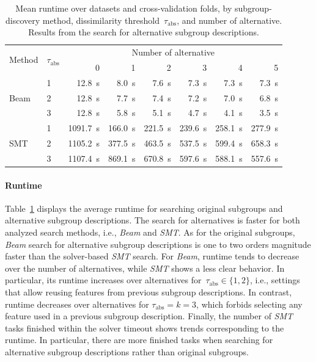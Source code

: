 \documentclass{article}
\theoremstyle{definition}
\begin{document}
\begin{table}[t]
	\centering
	\begin{tabular}{llrrrrrr}
		\toprule
		\multirow{2}{*}{Method} & \multirow{2}{*}{$\tau_{\text{abs}}$} & \multicolumn{6}{c}{Number of alternative} \\
		\cmidrule(lr){3-8}
		& &  0 & 1 & 2 & 3 & 4 & 5 \\
		\midrule
		\multirow[t]{3}{*}{Beam} & 1 & 12.8~s & 8.0~s & 7.6~s & 7.3~s & 7.3~s & 7.3~s \\
		& 2 & 12.8~s & 7.7~s & 7.4~s & 7.2~s & 7.0~s & 6.8~s \\
		& 3 & 12.8~s & 5.8~s & 5.1~s & 4.7~s & 4.1~s & 3.5~s \\
		\multirow[t]{3}{*}{SMT} & 1 & 1091.7~s & 166.0~s & 221.5~s & 239.6~s & 258.1~s & 277.9~s \\
		& 2 & 1105.2~s & 377.5~s & 463.5~s & 537.5~s & 599.4~s & 658.3~s \\
		& 3 & 1107.4~s & 869.1~s & 670.8~s & 597.6~s & 588.1~s & 557.6~s \\
		\bottomrule
	\end{tabular}
	\caption{
		Mean runtime over datasets and cross-validation folds, by subgroup-discovery method, dissimilarity threshold~$\tau_{\text{abs}}$, and number of alternative.
		Results from the search for alternative subgroup descriptions.
	}
	\label{tab:csd:alteratives-runtime}
\end{table}

\paragraph{Runtime}

Table~\ref{tab:csd:alteratives-runtime} displays the average runtime for searching original subgroups and alternative subgroup descriptions.
The search for alternatives is faster for both analyzed search methods, i.e., \emph{Beam} and \emph{SMT}.
As for the original subgroups, \emph{Beam} search for alternative subgroup descriptions is one to two orders magnitude faster than the solver-based \emph{SMT} search.
For \emph{Beam}, runtime tends to decrease over the number of alternatives, while \emph{SMT} shows a less clear behavior.
In particular, its runtime increases over alternatives for~$\tau_{\text{abs}} \in \{1, 2\}$, i.e., settings that allow reusing features from previous subgroup descriptions.
In contrast, runtime decreases over alternatives for $\tau_{\text{abs}} = k = 3$, which forbids selecting any feature used in a previous subgroup description.
Finally, the number of \emph{SMT} tasks finished within the solver timeout shows trends corresponding to the runtime.
In particular, there are more finished tasks when searching for alternative subgroup descriptions rather than original subgroups.
\end{document}
